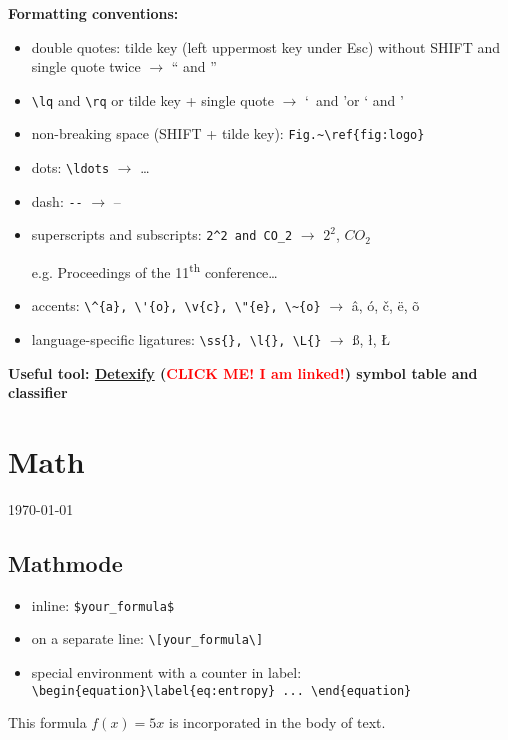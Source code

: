 \documentclass[a4paper,11pt,leqno]{article}
\begin{document}
\textbf{Formatting conventions:}

\begin{itemize}
	\item double quotes: tilde key (left uppermost key under Esc) without SHIFT and single quote twice $\rightarrow$ `` and ''
	\item \verb|\lq| and \verb|\rq| or tilde key + single quote $\rightarrow$ \lq~and \rq or ` and '
	\item non-breaking space (SHIFT + tilde key): \verb|Fig.~\ref{fig:logo}|
	\item dots: \verb|\ldots| $\rightarrow$ \ldots
	\item dash: \verb|--| $\rightarrow$ --
	\item superscripts and subscripts: \verb|2^2 and CO_2| $\rightarrow$ $2^2$, $CO_2$
	
	e.g. Proceedings of the 11\textsuperscript{th} conference\ldots
	
	\item accents: \verb|\^{a}, \'{o}, \v{c}, \"{e}, \~{o}| $\rightarrow$ \^{a}, \'{o}, \v{c}, \"{e}, \~{o}
	\item language-specific ligatures: \verb|\ss{}, \l{}, \L{}| $\rightarrow$ \ss{}, \l{}, \L{}
\end{itemize}

\textbf{Useful tool: \href{http://detexify.kirelabs.org/symbols.html}{Detexify} (\textcolor{red}{CLICK ME! I am linked!}) symbol table and classifier}

\section{Math}
\today
\subsection{Mathmode}

\begin{itemize}
	\item inline: \verb|$your_formula$|
	\item on a separate line: \verb|\[your_formula\]|
	\item special environment with a counter in label: \verb|\begin{equation}\label{eq:entropy} ... \end{equation}|
\end{itemize}

This formula $f(x)=5x$ is incorporated in the body of text. 
\end{document}
